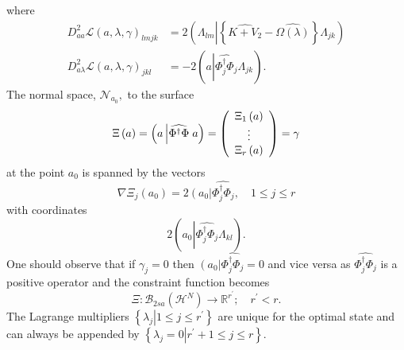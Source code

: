 \documentclass[aps,preprint]{revtex4}%
\begin{document}
where
\begin{align}
D_{aa}^{2}\mathcal{L}\left(  a,\lambda,\gamma\right)  _{lmjk} &  =2\left(
\Lambda_{lm}\left\vert \left\{  \widehat{K+V_{2}}-\widehat{\Omega\left(
\lambda\right)  }\right\}  \right.  \Lambda_{jk}\right)  \nonumber\\
D_{a\lambda}^{2}\mathcal{L}\left(  a,\lambda,\gamma\right)  _{jkl} &
=-2\left(  a\left\vert \widehat{\Phi_{j}^{\dagger}\Phi_{j}}\right.
\Lambda_{jk}\right)  .
\end{align}
The normal space, $\mathcal{N}_{a_{0}},$ to the surface
\begin{equation}
\Xi\left(  a\right)  =\left(  a\left\vert \widehat{\Phi^{\dagger}\Phi}\right.
a\right)  =\left(
\begin{array}
[c]{c}%
\Xi_{1}\left(  a\right)  \\
\vdots\\
\Xi_{r}\left(  a\right)
\end{array}
\right)  =\gamma
\end{equation}
at the point $a_{0}$ is spanned by the vectors
\begin{equation}
\nabla\Xi_{j}\left(  a_{0}\right)  =2\left(  \overset{}{a_{0}}\right\vert
\widehat{\Phi_{j}^{\dagger}\Phi_{j}},\quad1\leq j\leq r
\end{equation}
with coordinates
\begin{equation}
2\left(  a_{0}\left\vert \widehat{\Phi_{j}^{\dagger}\Phi_{j}}\right.
\Lambda_{kl}\right)  .
\end{equation}
One should observe that if $\gamma_{j}=0$ then $\left(  \overset{}{a_{0}%
}\right\vert \widehat{\Phi_{j}^{\dagger}\Phi_{j}}=0$ and vice versa as
$\widehat{\Phi_{j}^{\dagger}\Phi_{j}}$ is a positive operator and the
constraint function becomes
\begin{equation}
\Xi:\mathcal{B}_{2sa}\left(  \mathcal{H}^{N}\right)  \rightarrow
\mathbb{R}^{r^{\prime}};\quad r^{\prime}<r.
\end{equation}
The Lagrange multipliers $\left\{  \left.  \lambda_{j}\right\vert 1\leq j\leq
r^{\prime}\right\}  $ are unique for the optimal state and can always be
appended by $\left\{  \left.  \lambda_{j}=0\right\vert r^{\prime}+1\leq j\leq
r\right\}  .$  
\end{document}
